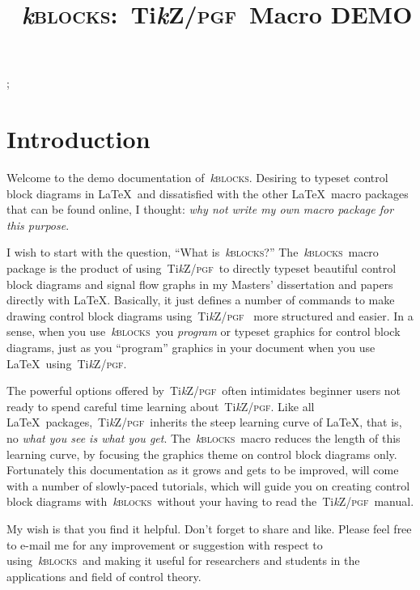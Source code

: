 \documentclass[tikz,onecolumn]{IEEEtran}
\newcommand*{\kblocks}{\relax~\textit{k}\textsc{blocks}}
\newcommand*{\TikzPGF}{\relax~{Ti\textit{k}Z/\textsc{pgf}}}
\begin{document}
\title{\kblocks:\TikzPGF~Macro DEMO}
\author{
}

\markboth{\kblocks~Demo. Version.~01, October~2019};


\maketitle

\section{Introduction}
Welcome to the demo documentation of\kblocks. Desiring to typeset control block diagrams in \LaTeX~and dissatisfied with the other \LaTeX~macro packages that
can be found online, I thought: \textit{why not write my own macro package for this purpose}.

I wish to start with the question, \enquote{What is\kblocks?} The\kblocks~macro package is the product of using\TikzPGF~to
directly typeset beautiful control block diagrams and signal flow graphs in my Masters' dissertation and papers directly with \LaTeX.
Basically, it just defines a number of commands to make drawing control block diagrams using\TikzPGF~ more structured and easier. In a sense, when you
use\kblocks~you \textit{program} or typeset graphics for control block diagrams, just as you “program” graphics in your document when you use
\LaTeX~using\TikzPGF.

The powerful options offered by\TikzPGF~often intimidates beginner users not ready to spend careful time learning about\TikzPGF. Like all
\LaTeX~packages,\TikzPGF~inherits the steep learning curve of \LaTeX, that is, no \textit{what you see is what you get}.
The\kblocks~macro reduces the length of this learning curve, by focusing the graphics theme on control block diagrams only.
Fortunately this documentation as it grows and gets to be improved, will come with a number of slowly-paced
tutorials, which will guide you on creating control block diagrams with\kblocks~without your having to read the\TikzPGF~manual.

My wish is that you find it helpful. Don't forget to share and like. Please feel free to e-mail me for any improvement or suggestion with respect to
using\kblocks~and making it
useful for researchers and students in the applications and field of control theory.
\end{document}
